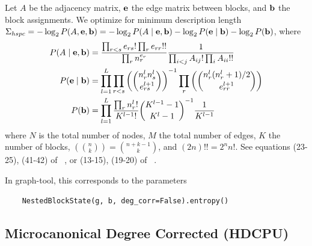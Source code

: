 \documentclass[aps,pre,superscriptaddress]{article}
\begin{document}
Let $A$ be the adjacency matrix, $\vb{e}$ the edge matrix between blocks, and $\vb{b}$ the block assignments.
We optimize for minimum description length $\Sigma_{hspc} = -\log_2P(A, \vb{e}, \vb{b}) = -\log_2 P(A \mid \vb{e}, \vb{b}) - \log_2 P(\vb{e} \mid \vb{b}) - \log_2 P(\vb{b})$, where
\begin{align}
	P(A \mid \vb{e}, \vb{b}) & = \frac{\prod_{r < s} e_{rs}! \prod_{r} e_{rr}!!}{\prod_r n_r^{e_r}} \frac{1}{\prod_{i < j} A_{ij}! \prod_{i} A_{ii}!!}                                    \\
	P(\vb{e} \mid \vb{b})    & = \prod_{l=1}^{L} \prod_{r < s} \left( \binom{n_r^l n_s^l}{e_{rs}^{l+1}} \right)^{-1} \prod_r \left( \binom{ n_r^l (n_r^l + 1) / 2 }{e_{rr}^{l+1} }\right) \\
	P(\vb{b})                & = \prod_{l=1}^L \frac{\prod_r n_r^l!}{K^{l-1}!} \binom{ K^{l-1} - 1}{K^l - 1}^{-1} \frac{1}{K^{l-1}}
\end{align}
where $N$ is the total number of nodes, $M$ the total number of edges, $K$ the number of blocks, $\left( \binom{n}{k} \right) = \binom{n + k - 1}{k}$, and $(2n)!! = 2^n n!$.
See equations (23-25), (41-42) of ~\cite{peixoto17-01}, or (13-15), (19-20) of ~\cite{funke19-04}.

In graph-tool, this corresponds to the parameters
\begin{verbatim}
    NestedBlockState(g, b, deg_corr=False).entropy()
\end{verbatim}

\subsection{Microcanonical Degree Corrected (HDCPU)}
\end{document}
